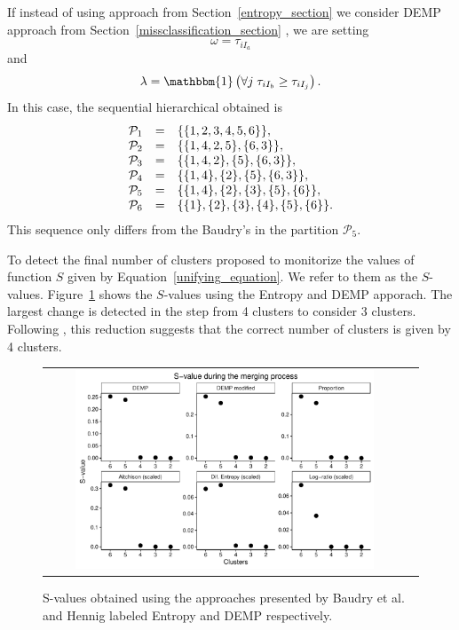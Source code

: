 \documentclass[submit]{smj}
\theoremstyle{definition}
\begin{document}
If instead of using approach from Section~\ref{entropy_section} \citep{baudry2010combining} we consider DEMP approach from Section~\ref{missclassification_section} \citep{hennig2010methods}, we are setting \[\omega = \tau_{i I_a}\] and \[\lambda = \mathbbm{1}\left( \forall j\; \tau_{i I_{b}} \geq \tau_{iI_j} \right).\] In this case, the sequential hierarchical obtained is
\begin{equation}
\begin{array}{r c l}
\mathcal{P}_1 &=& \{\{1, 2, 3, 4, 5, 6\}\}, \\
\mathcal{P}_2 &=& \{\{1, 4, 2, 5\}, \{6, 3\} \},  \\
\mathcal{P}_3 &=& \{\{1, 4, 2\}, \{5\}, \{6, 3\} \}, \\
\mathcal{P}_4 &=& \{\{1, 4\},\{2\}, \{5\}, \{6, 3\} \}, \\
\mathcal{P}_5 &=& \{\{1, 4\},\{2\}, \{3\},\{5\},\{6\} \},\\
\mathcal{P}_6 &=& \{\{1\},\{2\},\{3\},\{4\},\{5\},\{6\}\}.
\end{array}
\end{equation}
This sequence only differs from the Baudry's in the partition $\mathcal{P}_5$.  

To detect the final number of clusters \cite{baudry2010combining} proposed to monitorize the values of function $S$ given by Equation~\ref{unifying_equation}. We refer to them as the $S$-values. Figure~\ref{gaussian_Svalues} shows the $S$-values using the Entropy and DEMP apporach. The largest change is detected in the step from 4 clusters to consider 3 clusters. Following \cite{baudry2010combining}, this reduction suggests that the correct number of clusters is given by 4 clusters.

\begin{figure}[t]
\begin{center}
\begin{tabular}{cc}
  \includegraphics[width=0.85\textwidth]{figures/gaussian_Svalues.pdf} \\
 \end{tabular}
 \caption{S-values obtained using the approaches presented by Baudry et al. and Hennig labeled Entropy and DEMP respectively.}\label{gaussian_Svalues}
\end{center}
\end{figure}
\end{document}
